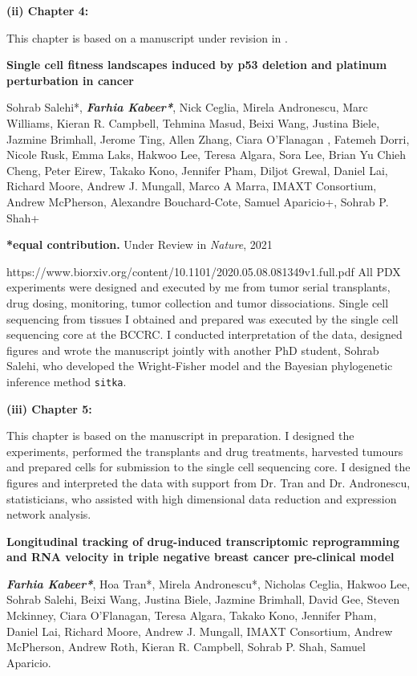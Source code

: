 
  \textbf{(ii) Chapter 4:}

This chapter is based on a manuscript under revision in .


 \textbf{Single  cell  fitness  landscapes  induced  by  p53  deletion and platinum perturbation in cancer}

Sohrab Salehi*, \emph{\textbf{Farhia Kabeer*}}, Nick Ceglia, Mirela Andronescu, Marc Williams, Kieran R. Campbell, Tehmina Masud, Beixi Wang, Justina Biele, Jazmine Brimhall, Jerome Ting, Allen Zhang, Ciara O'Flanagan , Fatemeh Dorri, Nicole Rusk, Emma Laks, Hakwoo Lee, Teresa Algara, Sora Lee, Brian Yu Chieh Cheng, Peter Eirew, Takako Kono, Jennifer Pham, Diljot Grewal, Daniel Lai, Richard Moore, Andrew J. Mungall, Marco A Marra, IMAXT Consortium, Andrew McPherson, Alexandre Bouchard-Cote, Samuel Aparicio+, Sohrab P. Shah+

 \textbf{*equal contribution.} Under Review in \textit{Nature}, 2021

https://www.biorxiv.org/content/10.1101/2020.05.08.081349v1.full.pdf
 All PDX experiments were designed and executed by me from tumor serial transplants, drug dosing, monitoring, tumor collection and tumor dissociations. Single cell sequencing from tissues I obtained and prepared was executed by the single cell sequencing core at the BCCRC. I conducted interpretation of the data, designed figures and wrote the manuscript jointly with another PhD student, Sohrab Salehi, who developed the Wright-Fisher model and the Bayesian phylogenetic inference method \texttt{sitka}.  


   \textbf{(iii) Chapter 5:}
   
This chapter is based on the manuscript in preparation. I designed the experiments, performed the transplants and drug treatments, harvested tumours and prepared cells for submission to the single cell sequencing core. I designed the figures and interpreted the data with support from Dr. Tran and Dr. Andronescu, statisticians, who assisted with high dimensional data reduction and expression network analysis.
  
\textbf{Longitudinal tracking of drug-induced transcriptomic reprogramming and RNA velocity in triple negative breast cancer pre-clinical model}

\emph{\textbf{Farhia Kabeer*}}, Hoa Tran*, Mirela Andronescu*,   
Nicholas Ceglia, Hakwoo Lee, Sohrab Salehi, Beixi Wang, Justina Biele, Jazmine Brimhall, David Gee, Steven Mckinney, Ciara O'Flanagan, Teresa Algara, Takako Kono, Jennifer Pham, Daniel Lai, Richard Moore, Andrew J. Mungall, IMAXT Consortium,  Andrew  McPherson, Andrew Roth, Kieran R. Campbell, Sohrab P. Shah, Samuel Aparicio.